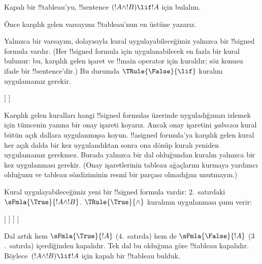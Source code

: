\documentclass[../../../include/open-logic-section]{subfiles}
\begin{document}
      {}
      {}


\begin{ex}
Kapalı bir !!{tableau}'yu, !!{sentence} $(!A \land !B) \lif !A$ için bulalım.

Önce karşılık gelen varsayımı !!{tableau}'nun en üstüne yazarız.
\begin{oltableau}
  [\sFmla{\False}{(\formula{A} \land \formula{B}) \lif \formula{A}},
    just = \TAss]
\end{oltableau}

Yalnızca bir varsayım, dolayısıyla kural uygulayabileceğimiz yalnızca bir
!!{signed formula} vardır. (Her !!{signed formula} için uygulanabilecek en
fazla bir kural bulunur: bu, karşılık gelen işaret ve !!{main operator} için
kuraldır; söz konusu ifade bir !!{sentence}'dir.) Bu durumda
$\TRule{\False}{\lif}$ kuralını uygulamamız gerekir.
\begin{oltableau}
  [\sFmla{\False}{(\formula{A} \land \formula{B}) \lif \formula{A}},
    checked, just = \TAss
    [\sFmla{\True}{\formula{A} \land \formula{B}},
      just={\TRule{\False}{\lif}[1]}
      [\sFmla{\False}{\formula{A}}, just={\TRule{\False}{\lif}[1]}]
    ]
  ]
\end{oltableau}
Karşılık gelen kuralları hangi !!{signed formula}s üzerinde uyguladığımızı
izlemek için tümcenin yanına bir onay işareti koyarız. Ancak onay işaretini
\emph{yalnızca} kural bütün açık dallara uygulanmışsa koyun.
!!a{signed formula}'ya karşılık gelen kural her açık dalda bir kez uygulandıktan sonra
ona dönüp kuralı yeniden uygulamamız gerekmez. Burada yalnızca bir dal
olduğundan kuralın yalnızca bir kez uygulanması gerekir. (Onay işaretlerinin
tableau ağaçlarını kurmaya yardımcı olduğunu ve tableau sözdiziminin resmî
bir parçası olmadığını unutmayın.)

Kural uygulayabileceğimiz yeni bir !!{signed formula} vardır: $2$.~satırdaki
$\sFmla{\True}{!A \land !B}$. $\TRule{\True}{\land}$ kuralının uygulanması
şunu verir:
\begin{oltableau}
  [\sFmla{\False}{(\formula{A} \land \formula{B}) \lif \formula{A}},
    checked, just = \TAss
    [\sFmla{\True}{\formula{A} \land \formula{B}},
      just={\TRule{\False}{\lif}[1]}, checked
      [\sFmla{\False}{\formula{A}}, just={\TRule{\False}{\lif}[1]}
        [\sFmla{\True}{\formula{A}}, just={\TRule{\True}{\land}[2]}
          [\sFmla{\True}{\formula{B}}, just={\TRule{\True}{\land}[2]}, close
          ]
        ]
      ]
    ]
  ]
\end{oltableau}
Dal artık hem $\sFmla{\True}{!A}$ ($4$.~satırda) hem de
$\sFmla{\False}{!A}$ ($3$.~satırda) içerdiğinden kapalıdır. Tek dal bu
olduğuna göre !!{tableau} kapalıdır. Böylece~$(!A \land !B) \lif !A$ için
kapalı bir !!{tableau} bulduk.
\end{ex}
\end{document}
